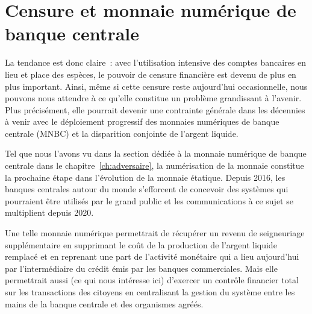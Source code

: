 \section*{Censure et monnaie numérique de banque centrale}


La tendance est donc claire~: avec l'utilisation intensive des comptes bancaires en lieu et place des espèces, le pouvoir de censure financière est devenu de plus en plus important. Ainsi, même si cette censure reste aujourd'hui occasionnelle, nous pouvons nous attendre à ce qu'elle constitue un problème grandissant à l'avenir. Plus précisément, elle pourrait devenir une contrainte générale dans les décennies à venir avec le déploiement progressif des monnaies numériques de banque centrale (MNBC) et la disparition conjointe de l'argent liquide.

Tel que nous l'avons vu dans la section dédiée à la monnaie numérique de banque centrale dans le chapitre~\ref{ch:adversaire}, la numérisation de la monnaie constitue la prochaine étape dans l'évolution de la monnaie étatique. Depuis 2016, les banques centrales autour du monde s'efforcent de concevoir des systèmes qui pourraient être utilisés par le grand public et les communications à ce sujet se multiplient depuis 2020.

Une telle monnaie numérique permettrait de récupérer un revenu de seigneuriage supplémentaire en supprimant le coût de la production de l'argent liquide remplacé et en reprenant une part de l'activité monétaire qui a lieu aujourd'hui par l'intermédiaire du crédit émis par les banques commerciales. Mais elle permettrait aussi (ce qui nous intéresse ici) d'exercer un contrôle financier total sur les transactions des citoyens en centralisant la gestion du système entre les mains de la banque centrale et des organismes agréés.

